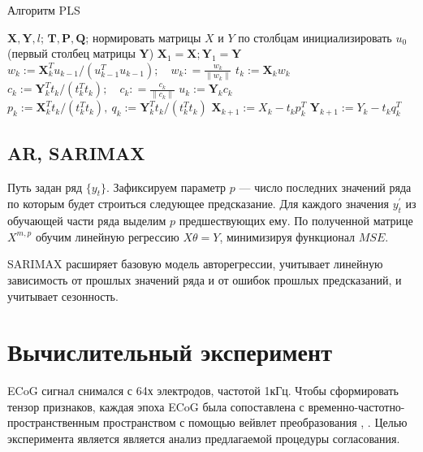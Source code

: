 \documentclass{article}
\begin{document}
\begin{algorithm}[h]\label{alg1}
	\caption{Алгоритм PLS}
	\label{ch1:pls_pseudocode}
	\begin{algorithmic}[1]
		\REQUIRE $\mathbf{X}, \mathbf{Y}, l$;
		\ENSURE $\mathbf{T}, \mathbf{P}, \mathbf{Q}$;
		\STATE нормировать матрицы $X$ и $Y$ по столбцам
		\STATE инициализировать $u_0$ (первый столбец матрицы $\mathbf{Y}$)
		\STATE $\mathbf{X}_1 = \mathbf{X}; \mathbf{Y}_1 = \mathbf{Y}$
		\REPEAT
		\vspace{0.1cm}
		\STATE $w_k := \mathbf{X}_k^{T} u_{k-1} / (u_{k-1}^{T} u_{k-1}); \quad w_k: = \frac{w_k}{\| w_k \|}$
		\vspace{0.1cm}
		\STATE $t_k := \mathbf{X}_k w_k$
		\vspace{0.1cm}
		\STATE $c_k := \mathbf{Y}_k^{T} t_k / (t_k^{T} t_k); \quad c_k: = \frac{c_k}{\| c_k \|}$
		\vspace{0.1cm}
		\STATE $u_k := \mathbf{Y}_k c_k$
		\vspace{0.1cm}
		\STATE $p_k:= \mathbf{X}_k^{T}t_k/(t_k^{T}t_k),\ 
		q_k := \mathbf{Y}_k^{T}t_k/(t_k^{T}t_k)$
		\vspace{0.2cm}
		\STATE $\mathbf{X}_{k+1} :=  X_k - t_k p_k^{T}$
		\vspace{0.2cm}
		\STATE $\mathbf{Y}_{k + 1} :=  Y_k - t_k q_k^{T}$ 
		\ENDFOR
	\end{algorithmic}
\end{algorithm}
\subsection{AR, SARIMAX}

Путь задан ряд $\{y_t\}$. Зафиксируем параметр $p$ --- число последних значений ряда по которым будет строиться следующее предсказание. Для каждого значения $y_t^{'}$ из обучающей части ряда выделим $p$ предшествующих ему. По полученной матрице $X^{m, p}$ обучим линейную регрессию $X\theta = Y$, минимизируя функционал $MSE$.

\par
SARIMAX  \cite{7514029} расширяет базовую модель авторегрессии, учитывает линейную зависимость от прошлых значений ряда и от ошибок  прошлых предсказаний, и учитывает сезонность.
 

\section{Вычислительный эксперимент}
ECoG сигнал снимался с 64х электродов, частотой 1кГц. Чтобы сформировать тензор признаков, каждая эпоха ECoG была сопоставлена с временно-частотно-пространственным пространством с помощью вейвлет преобразования \cite{eliseyev2016penalized}, \cite{chao2010long}. Целью эксперимента является является анализ предлагаемой процедуры согласования.
\end{document}
